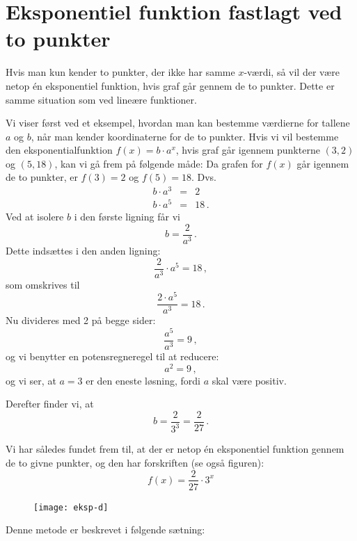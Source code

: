 \documentclass[12pt,oneside,a4paper]{article}
\newcommand{\bas}{\begin{eqnarray*}}
\newcommand{\eas}{\end{eqnarray*}}
\theoremstyle{plain}
\begin{document}
\section*{Eksponentiel funktion fastlagt ved to punkter}
Hvis man kun kender to punkter, der ikke har samme $x$-værdi, så vil der være
netop én eksponentiel funktion,
hvis graf går gennem de to punkter. Dette er samme situation som ved lineære
funktioner.

Vi viser først ved et eksempel, hvordan man kan bestemme værdierne for tallene
$a$ og $b$, når man kender koordinaterne for de to punkter.  Hvis vi vil
bestemme den eksponentialfunktion $f(x) = b\cdot a^x$, hvis graf går igennem
punkterne $(3, 2)$ og $(5, 18)$, kan vi gå frem på følgende måde: Da grafen for
$f(x)$ går igennem de to punkter, er $f(3) = 2$ og $f(5) = 18$. Dvs.
\bas
b \cdot a^3  &=& 2\\
b \cdot a^5  &=& 18 \,.
\eas
Ved at isolere $b$ i den første ligning får vi
$$
b = \frac{2}{a^3} \,.
$$
Dette indsættes i den anden ligning:
$$
\frac{2}{a^3} \cdot a^5 = 18 \,,
$$
som omskrives til
$$
\frac{2 \cdot a^5}{a^3} = 18 \,.
$$
Nu divideres med 2 på begge sider:
$$
\frac{a^5}{a^3} = 9 \,,
$$
og vi benytter en potensregneregel til at reducere:
$$
a^2 = 9 \,,
$$
og vi ser, at $a=3$ er den eneste løsning, fordi $a$ skal være positiv.

Derefter finder vi, at 
$$
b = \frac{2}{3^3} = \frac{2}{27} \,.
$$

Vi har således fundet frem til, at der er netop én eksponentiel funktion gennem
de to givne punkter, og den har forskriften (se også figuren):
$$
f(x) = \frac{2}{27} \cdot 3^x
$$

\begin{figure}[ht]
    \centering
    \texttt{[image: eksp-d]}
    \label{eksp-d}
\end{figure}

Denne metode er beskrevet i følgende sætning:
\end{document}
